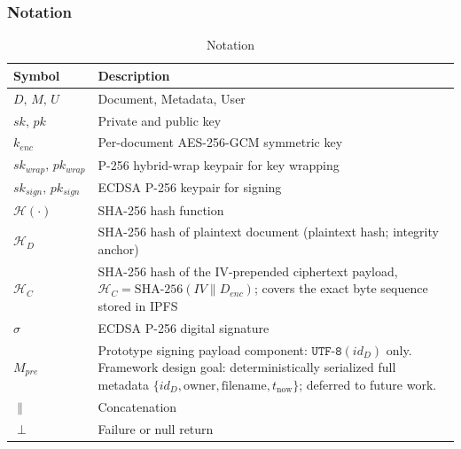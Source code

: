 \documentclass[preprint,12pt]{elsarticle}
\begin{document}
\subsubsection{Notation}

\begin{table}[ht]
    \caption{Notation}
    \centering
    \renewcommand{\arraystretch}{1.3}
    \begin{tabularx}{\columnwidth}{@{} p{2.2cm}
                                       >{\raggedright\arraybackslash}X @{}}
        \toprule
        \textbf{Symbol} & \textbf{Description} \\
        \midrule
        $D,\,M,\,U$ & Document, Metadata, User \\
        $sk,\,pk$ & Private and public key \\
        $k_{enc}$ & Per-document AES-256-GCM symmetric key \\
        $sk_{wrap},\,pk_{wrap}$ & P-256 hybrid-wrap keypair for key wrapping \\
        $sk_{sign},\,pk_{sign}$ & ECDSA P-256 keypair for signing \\
        $\mathcal{H}(\cdot)$ & SHA-256 hash function \\
        $\mathcal{H}_D$ & SHA-256 hash of plaintext
        document (plaintext hash; integrity anchor) \\
        $\mathcal{H}_C$ &
        SHA-256 hash of the IV-prepended ciphertext payload,
        $\mathcal{H}_C = \text{SHA-256}(IV \| D_{enc})$;
        covers the exact byte sequence stored in IPFS \\
        $\sigma$ & ECDSA P-256 digital signature \\
        $M_{pre}$ & Prototype signing payload component:
        $\texttt{UTF-8}(id_D)$ only. Framework design goal:
        deterministically serialized full metadata
        $\{id_D, \text{owner}, \text{filename}, t_{\text{now}}\}$;
        deferred to future work. \\
        $\|$ & Concatenation \\
        $\perp$ & Failure or null return \\
        \bottomrule
    \end{tabularx}
\end{table}
\end{document}
